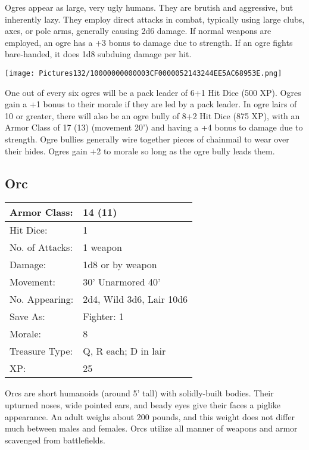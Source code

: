 \documentclass[a4paper,twoside,openany,10pt]{book}
\begin{document}
\begin{multicols}{2}
Ogres appear as large, very ugly humans. They are brutish and aggressive, but inherently lazy. They employ direct attacks in combat, typically using large clubs, axes, or pole arms, generally causing 2d6 damage. If normal weapons are employed, an ogre has a +3 bonus to damage due to strength. If an ogre fights bare-handed, it does 1d8 subduing damage per hit.

\begin{center} \texttt{[image: Pictures132/10000000000003CF0000052143244EE5AC68953E.png]} \end{center}

One out of every six ogres will be a pack leader of 6+1 Hit Dice (500 XP). Ogres gain a +1 bonus to their morale if they are led by a pack leader. In ogre lairs of 10 or greater, there will also be an ogre bully of 8+2 Hit Dice (875 XP), with an Armor Class of 17 (13) (movement 20') and having a +4 bonus to damage due to strength. Ogre bullies generally wire together pieces of chainmail to wear over their hides. Ogres gain +2 to morale so long as the ogre bully leads them.

\subsection*{Orc}\label{orc}

\begin{tabularx}{0.50\textwidth}{@{}lX@{}}
Armor Class: & 14 (11) \\\hline
Hit Dice: & 1 \\\hline
No. of Attacks: & 1 weapon \\\hline
Damage: & 1d8 or by weapon \\\hline
Movement: & 30' Unarmored 40' \\\hline
No. Appearing: & 2d4, Wild 3d6, Lair 10d6 \\\hline
Save As: & Fighter: 1 \\\hline
Morale: & 8 \\\hline
Treasure Type: & Q, R each; D in lair \\\hline
XP: & 25 \\\hline
\end{tabularx}\medskip

Orcs are short humanoids (around 5' tall) with solidly-built bodies. Their upturned noses, wide pointed ears, and beady eyes give their faces a piglike appearance. An adult weighs about 200 pounds, and this weight does not differ much between males and females. Orcs utilize all manner of weapons and armor scavenged from battlefields.



\end{multicols}
\end{document}
